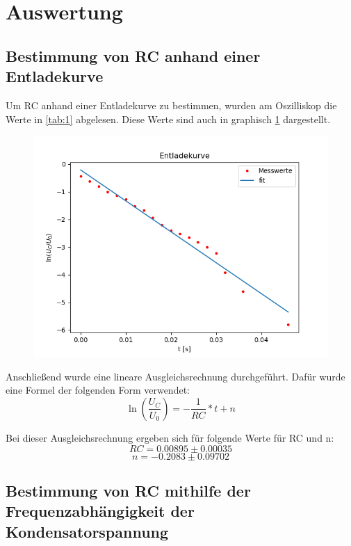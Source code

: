 \section{Auswertung}

\subsection{Bestimmung von RC anhand einer Entladekurve}

Um RC anhand einer Entladekurve zu bestimmen, wurden am Oszilliskop die Werte in \ref{tab:1} abgelesen. Diese Werte sind auch in graphisch \ref{fig:1} dargestellt.

\begin{figure}[H]
    \centering
    \includegraphics{1.png}
    \label{fig:1}
\end{figure}

\noindent Anschließend wurde eine lineare Ausgleichsrechnung durchgeführt. Dafür wurde eine Formel der folgenden Form verwendet:
\begin{displaymath}
    \ln(\frac{U_C}{U_0}) = -\frac{1}{RC} * t + n 
\end{displaymath}

\noindent Bei dieser Ausgleichsrechnung ergeben sich für folgende Werte für RC und n:
\begin{displaymath}
    RC = 0.00895 \pm 0.00035
\end{displaymath}
\begin{displaymath}
    n = -0.2083 \pm 0.09702
\end{displaymath}

\subsection{Bestimmung von RC mithilfe der Frequenzabhängigkeit der Kondensatorspannung}

